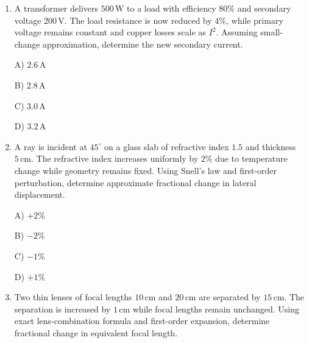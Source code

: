 \documentclass[12pt]{article}
\begin{document}
\begin{enumerate}[leftmargin=*]
A) \(0\)  

B) \(+2\%\)  

C) \(-2\%\)  

D) \(+4\%\)  

\item A transformer delivers \(500\,\text{W}\) to a load with efficiency \(80\%\) and secondary voltage \(200\,\text{V}\). The load resistance is now reduced by \(4\%\), while primary voltage remains constant and copper losses scale as \(I^2\). Assuming small-change approximation, determine the new secondary current.  

A) \(2.6\,\text{A}\)  

B) \(2.8\,\text{A}\)  

C) \(3.0\,\text{A}\)  

D) \(3.2\,\text{A}\)  

\item A ray is incident at \(45^\circ\) on a glass slab of refractive index \(1.5\) and thickness \(5\,\text{cm}\). The refractive index increases uniformly by \(2\%\) due to temperature change while geometry remains fixed. Using Snell’s law and first-order perturbation, determine approximate fractional change in lateral displacement.  


A) \(+2\%\)  

B) \(-2\%\)  

C) \(-1\%\)  

D) \(+1\%\)  

\item Two thin lenses of focal lengths \(10\,\text{cm}\) and \(20\,\text{cm}\) are separated by \(15\,\text{cm}\). The separation is increased by \(1\,\text{cm}\) while focal lengths remain unchanged. Using exact lens-combination formula and first-order expansion, determine fractional change in equivalent focal length.  


\end{enumerate}
\end{document}

